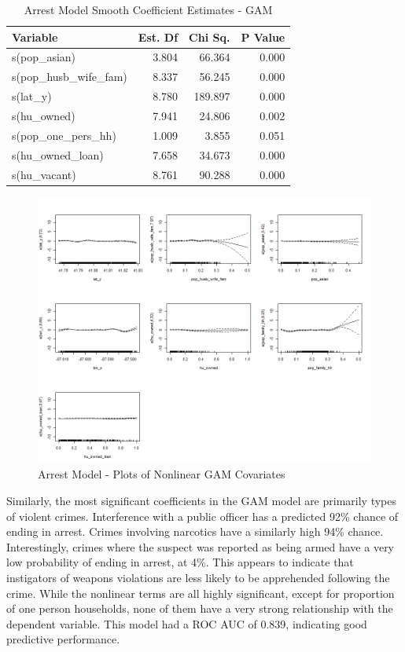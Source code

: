 \documentclass{ucetd}
\begin{document}
\begin{table}

\caption{\label{tab:arrest-gam}Arrest Model Smooth Coefficient Estimates - GAM}
\centering
\begin{tabular}[t]{l|r|r|r}
\hline
Variable & Est. Df & Chi Sq. & P Value\\
\hline
s(pop\_asian) & 3.804 & 66.364 & 0.000\\
\hline
s(pop\_husb\_wife\_fam) & 8.337 & 56.245 & 0.000\\
\hline
s(lat\_y) & 8.780 & 189.897 & 0.000\\
\hline
s(hu\_owned) & 7.941 & 24.806 & 0.002\\
\hline
s(pop\_one\_pers\_hh) & 1.009 & 3.855 & 0.051\\
\hline
s(hu\_owned\_loan) & 7.658 & 34.673 & 0.000\\
\hline
s(hu\_vacant) & 8.761 & 90.288 & 0.000\\
\hline
\end{tabular}
\end{table}

\begin{figure}
\centering
\includegraphics[width=1\textwidth,height=\textheight]{..//Modeling/modeling_files/figure-gfm/gam-arrests-1.png}
\caption{Arrest Model - Plots of Nonlinear GAM Covariates}
\end{figure}

Similarly, the most significant coefficients in the GAM model are
primarily types of violent crimes. Interference with a public officer
has a predicted 92\% chance of ending in arrest. Crimes involving
narcotics have a similarly high 94\% chance. Interestingly, crimes where
the suspect was reported as being armed have a very low probability of
ending in arrest, at 4\%. This appears to indicate that instigators of
weapons violations are less likely to be apprehended following the
crime. While the nonlinear terms are all highly significant, except for
proportion of one person households, none of them have a very strong
relationship with the dependent variable. This model had a ROC AUC of
0.839, indicating good predictive performance.
\end{document}
